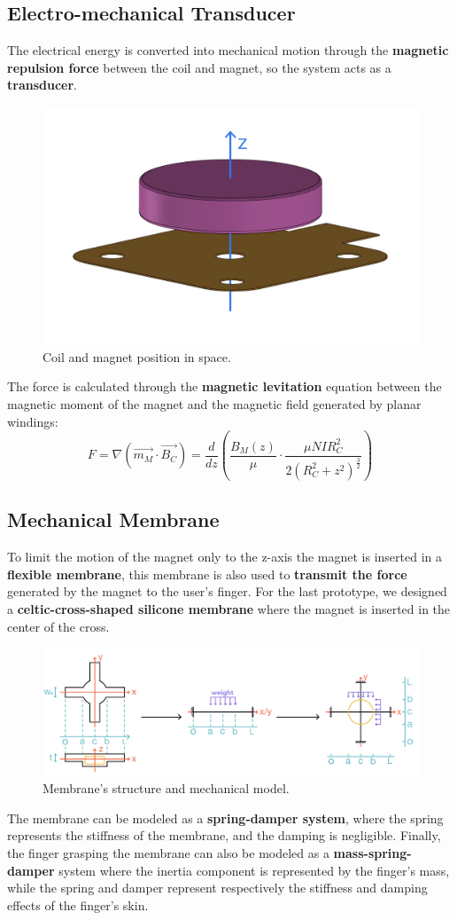 \subsection{Electro-mechanical Transducer}
The electrical energy is converted into mechanical motion through the \textbf{magnetic repulsion force} between the coil and magnet, so the system acts as a \textbf{transducer}.
\begin{figure}[H]
    \centering
    \includegraphics[width=0.4\columnwidth]{Figures/coil_magnet.png} 
    \caption[Coil-Magnet position]{Coil and magnet position in space.}
\end{figure}
The force is calculated through the \textbf{magnetic levitation} equation between the magnetic moment of the magnet and the magnetic field generated by planar windings:
\begin{equation*}
    F = \nabla (\overrightarrow{m_M} \cdot \overrightarrow{B_C}) = \frac{d}{dz} \left( \frac{B_M(z)}{\mu} \cdot \frac{\mu N I R_C^2}{2(R_C^2+z^2)^\frac{3}{2}} \right)
\end{equation*}

\subsection{Mechanical Membrane}
To limit the motion of the magnet only to the z-axis the magnet is inserted in a \textbf{flexible membrane}, this membrane is also used to \textbf{transmit the force} generated by the magnet to the user's finger.
For the last prototype, we designed a \textbf{celtic-cross-shaped silicone membrane} where the magnet is inserted in the center of the cross.
\begin{figure}[H]
    \centering
    \includegraphics[width=0.9\linewidth]{Figures/membr_mech_model.jpg} 
    \caption[Membrane structure]{Membrane's structure and mechanical model.}
\end{figure}
The membrane can be modeled as a \textbf{spring-damper system}, where the spring represents the stiffness of the membrane, and the damping is negligible.
Finally, the finger grasping the membrane can also be modeled as a \textbf{mass-spring-damper} system where the inertia component is represented by the finger's mass, while the spring and damper represent respectively the stiffness and damping effects of the finger's skin.
